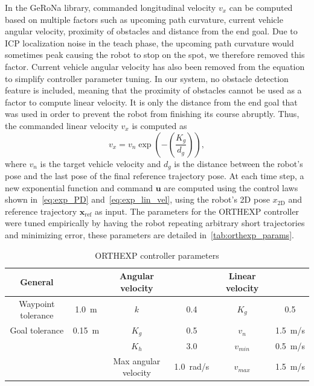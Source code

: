 In the \ac{GeRoNa} library, commanded longitudinal velocity $v_x$ can be computed based on multiple factors such as upcoming path curvature, current vehicle angular velocity, proximity of obstacles and distance from the end goal.
Due to \ac{ICP} localization noise in the teach phase, the upcoming path curvature would sometimes peak causing the robot to stop on the spot, we therefore removed this factor.
Current vehicle angular velocity has also been removed from the equation to simplify controller parameter tuning.
In our system, no obstacle detection feature is included, meaning that the proximity of obstacles cannot be used as a factor to compute linear velocity.
It is only the distance from the end goal that was used in order to prevent the robot from finishing its course abruptly.
Thus, the commanded linear velocity $v_x$ is computed as
\begin{equation}
\label{eq:exp_lin_vel}
v_x = v_n \exp\left(-\left(\frac{K_g}{d_g}\right)\right),
\end{equation}
where $v_n$ is the target vehicle velocity and $d_g$ is the distance between the robot's pose and the last pose of the final reference trajectory pose. 
At each time step, a new exponential function and command $\bm u$ are computed using the control laws shown in~\autoref{eq:exp_PD} and~\autoref{eq:exp_lin_vel}, using the robot's 2D pose $x_{\text{2D}}$ and reference trajectory $\bm x_{\text{ref}}$ as input.
The parameters for the \ac{ORTHEXP} controller were tuned empirically by having the robot repeating arbitrary short trajectories and minimizing error, these parameters are detailed in~\autoref{tab:orthexp_params}.


\begin{table}[htpb]
	\caption{\ac{ORTHEXP} controller parameters} \label{tab:orthexp_params}
	\begin{center}
		\begin{tabular}{c c | c c | c c}
			General & & Angular velocity & & Linear velocity \\
			\hline
			Waypoint tolerance & \SI{1.0}{m} & $k$ & 0.4 & $K_g$ & 0.5 \\
			Goal tolerance & \SI{0.15}{m} & $K_g$ & 0.5 & $v_n$ & \SI{1.5}{m/s} \\
			 & & $K_h$ & 3.0 & $v_{min}$ & \SI{0.5}{m/s} \\
			 & & Max angular velocity & \SI{1.0}{rad/s} & $v_{max}$ & \SI{1.5}{m/s} \\
		\end{tabular}
	\end{center}
\end{table}

